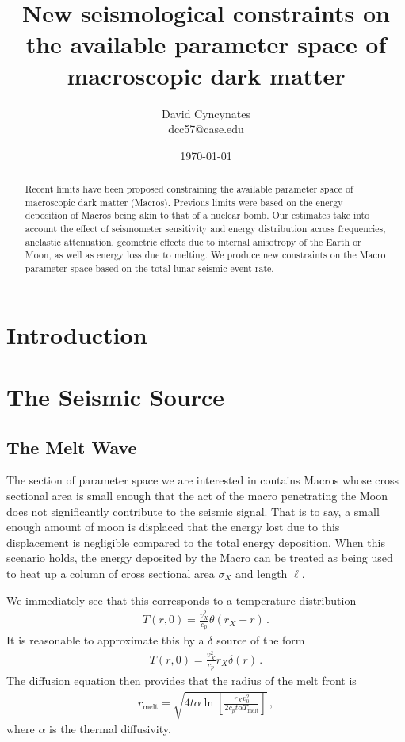 \documentclass[prd,reprint,10pt,tightenlines]{revtex4-1}
\newcommand*\te[1]{\text{#1}}
\newcommand*\ps[1]{\left[#1\right]}
\newcommand*\f[2]{\frac{#1}{#2}}
\begin{document}
\title{New seismological constraints on the available parameter space of macroscopic dark matter}
\author{David Cyncynates \\ dcc57@case.edu}
\date{\today}
\begin{abstract}
Recent limits have been proposed constraining the available parameter space of macroscopic dark matter (Macros). Previous limits were based on the energy deposition of Macros being akin to that of a nuclear bomb. Our estimates take into account the effect of seismometer sensitivity and energy distribution across frequencies, anelastic attenuation, geometric effects due to internal anisotropy of the Earth or Moon, as well as energy loss due to melting. We produce new constraints on the Macro parameter space based on the total lunar seismic event rate.
\end{abstract}
\maketitle
\section{Introduction}

\section{The Seismic Source}
\subsection{The Melt Wave}
The section of parameter space we are interested in contains Macros whose cross sectional area is small enough that the act of the macro penetrating the Moon does not significantly contribute to the seismic signal. That is to say, a small enough amount of moon is displaced that the energy lost due to this displacement is negligible compared to the total energy deposition. When this scenario holds, the energy deposited by the Macro can be treated as being used to heat up a column of cross sectional area $\sigma_X$ and length $\ell$.

We immediately see that this corresponds to a temperature distribution
\begin{align}
T(r,0) = \f{v_X^2}{c_p}\theta(r_X-r)\,.
\end{align}
It is reasonable to approximate this by a $\delta$ source of the form
\begin{align}
T(r,0) = \f{v_X^2}{c_p}r_X\delta(r)\,.
\end{align}
The diffusion equation then provides that the radius of the melt front is
\begin{align}
r_\te{melt} = \sqrt{4t\alpha\ln\ps{\f{r_X v_0^2}{2 c_p t \alpha T_\te{melt}}}}\,,
\end{align}
where $\alpha$ is the thermal diffusivity. 
\end{document}
